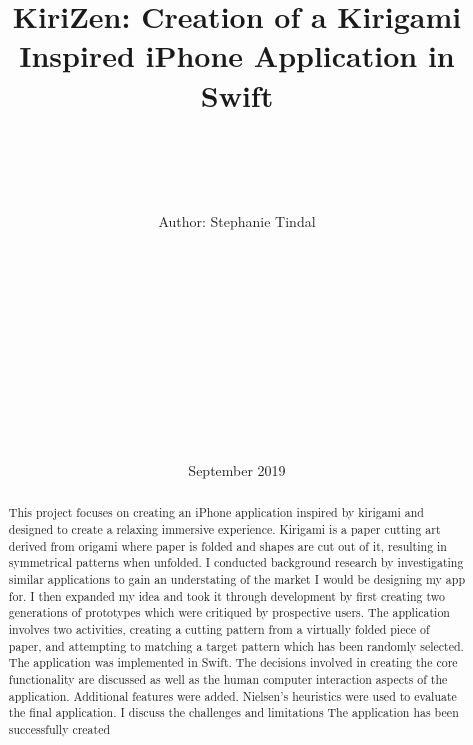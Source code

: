 \documentclass[11pt]{article}
\begin{document}
\begin{titlepage}
    \title{\vspace{40pt}\Huge KiriZen: Creation of a Kirigami Inspired iPhone Application in Swift}

    \author{ \\\hline \\\\\\ \Large \vspace{5pt} Author: Stephanie Tindal \\\Large \vspace{5pt}{Student ID: 1936508}\\\Large \vspace{50pt}{Supervisor: Achim Jung} \\ \hline\\\\\\  \vspace{5pt}{MSc Computer Science} \\ \vspace{5pt}{School of Computer Science, University of Birmingham}\\\\\\ \hline\\\\}

    \date{September 2019 \vspace{20pt}}
    \maketitle

\end{titlepage}
    \tableofcontents
\newpage

\begin{abstract}
    This project focuses on creating an iPhone application inspired by kirigami and designed to create a relaxing immersive experience. Kirigami is a paper cutting art derived from origami where paper is folded and shapes are cut out of it, resulting in symmetrical patterns when unfolded. I conducted background research by investigating similar applications to gain an understating of the market I would be designing my app for. I then expanded my idea and took it through development by first creating two generations of prototypes which were critiqued by prospective users. The application involves two activities, creating a cutting pattern from a virtually folded piece of paper, and attempting to matching a target pattern which has been randomly selected. The application was implemented in Swift. The decisions involved in creating the core functionality are discussed as well as the human computer interaction aspects of the application. Additional features were added. Nielsen's heuristics were used to evaluate the final application. I discuss the challenges and limitations The application has been successfully created 

\end{abstract}
\end{document}
